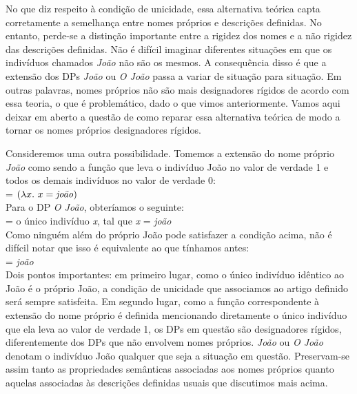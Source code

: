 No que diz respeito à condição de unicidade, essa alternativa teórica capta corretamente a semelhança entre nomes próprios e descrições definidas. No entanto, perde-se a distinção importante entre a rigidez dos nomes e a não rigidez das descrições definidas. Não é difícil imaginar
diferentes situações em que os indivíduos chamados \textit{João}
não são os mesmos. A consequência disso é que a extensão dos DPs
\textit{João} ou \textit{O João} passa a variar de situação para situação. Em
outras palavras, nomes próprios não são mais designadores rígidos
de acordo com essa teoria, o que é problemático, dado o que vimos
anteriormente. Vamos aqui deixar em aberto a questão de como reparar
essa alternativa teórica de modo a tornar os nomes próprios
designadores rígidos.

Consideremos uma outra possibilidade. Tomemos a extensão
do nome próprio \textit{João} como sendo a função que leva o indivíduo
João no valor de verdade 1 e todos os demais
indivíduos no valor de verdade 0:\\

\n {} = $(\lambda x.\ x=\text{\textit{joão}})$\\

\n Para o DP \textit{O João}, obteríamos o seguinte:\\

\n {} = o único indivíduo \textit{x}, tal que \textit{x}
= \textit{joão}\\

\n Como ninguém além do próprio João pode satisfazer a condição acima, não é difícil notar que isso é equivalente ao que tínhamos
antes:\\

\n{} = \textit{joão}\\

\n Dois pontos importantes: em primeiro lugar, como o único indivíduo
idêntico ao João é o próprio João, a condição de unicidade que
associamos ao artigo definido será sempre satisfeita. Em segundo
lugar, como a função correspondente à extensão do nome próprio é
definida mencionando diretamente o único indivíduo que ela leva ao
valor de verdade 1, os DPs em questão são designadores rígidos,
diferentemente dos DPs que não envolvem nomes próprios. \textit{João} ou
\textit{O João} denotam o indivíduo João qualquer que seja a situação em
questão. Preservam-se assim tanto as propriedades semânticas
associadas aos nomes próprios quanto aquelas associadas às
descrições definidas usuais que discutimos mais acima.

